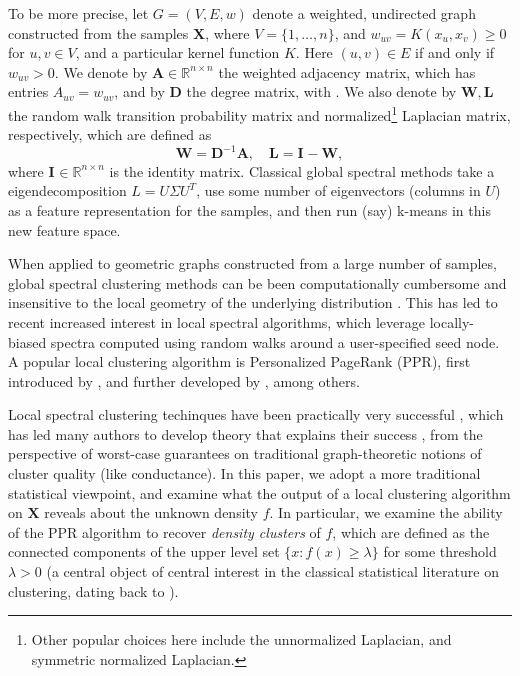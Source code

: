 \documentclass{article}
\newcommand{\Reals}{\mathbb{R}}
\newcommand{\1}{\mathbf{1}}
\newcommand{\Abf}{\mathbf{A}}
\newcommand{\Xbf}{\mathbf{X}}
\newcommand{\Wbf}{\mathbf{W}}
\newcommand{\Lbf}{\mathbf{L}}
\newcommand{\Dbf}{\mathbf{D}}
\newcommand{\Ibf}[1]{\mathbf{I}_{#1}}
\theoremstyle{aldenthm}
\theoremstyle{aldenrmrk}
\begin{document}
To be more precise, let $G=(V,E,w)$ denote a weighted, undirected graph  
constructed from the samples $\mathbf{X}$, where $V=\{1,\ldots,n\}$, and $w_{uv}
= K(x_u,x_v) \geq 0$ for $u,v \in V$, and a particular kernel function $K$.
Here $(u,v) \in E$ if and only if $w_{uv} > 0$.  We denote by $\Abf \in
\Reals^{n \times n}$ the weighted adjacency matrix, which has entries
$A_{uv}=w_{uv}$, and by $\Dbf$ the degree matrix, with 
\smash{$\Dbf_{uu} = \sum_{v \in V} \Abf_{uv}$}.  We also denote by $\Wbf,\Lbf$
the random walk transition probability matrix and normalized\footnote{Other
  popular choices here include the unnormalized Laplacian, and symmetric
  normalized Laplacian.} 
Laplacian matrix, respectively, which are defined as
$$
\Wbf = \Dbf^{-1}\Abf, \quad \Lbf = \Ibf{} - \Wbf,
$$
where $\Ibf{} \in \Reals^{n\times n}$ is the identity matrix.  Classical global
spectral methods take a eigendecomposition $L=U \Sigma U^T$, use some 
number of eigenvectors (columns in $U$) as a feature representation for the
samples, and then run (say) k-means in this new feature space.

When applied to geometric graphs constructed from a large number of samples,
global spectral clustering methods can be been computationally cumbersome and   
insensitive to the local geometry of the underlying distribution
\citep{leskovec2010,mahoney2012}.  This has led to recent increased interest in
local spectral algorithms, which leverage locally-biased spectra computed using
random walks around a user-specified seed node.  A popular local clustering
algorithm is Personalized PageRank (PPR), first introduced by
\citet{haveliwala2003}, and further developed by
\citet{spielman2011,spielman2014,anderson2006,mahoney2012,zhu2013}, among 
others.  

Local spectral clustering techinques have been practically very successful
\citep{leskovec2010,mahoney2012,REFS}, which
has led many authors to develop theory that explains their success 
\citep{zhu2013,REFS},
from the perspective of worst-case guarantees on traditional graph-theoretic
notions of cluster quality (like conductance).  In this paper, we adopt a more
traditional statistical viewpoint, and examine what the output of a local
clustering algorithm on $\Xbf$ reveals about the unknown density $f$.  
In particular, we examine the ability of the PPR algorithm to recover
\emph{density clusters} of $f$, which are defined as the connected components of
the upper level set $\{x : f(x) \geq \lambda\}$ for some threshold $\lambda >
0$ (a central object of central interest in the classical statistical literature
on clustering, dating back to \citealt{hartigan1981}). 
\end{document}
